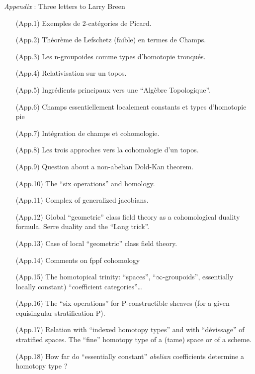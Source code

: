 \documentclass[11pt,a4paper]{article}
\begin{document}
\emph{Appendix} : Three letters to Larry Breen
\begin{itemize}
  \item[(App.1)] Exemples de 2-catégories de Picard.
  \item[(App.2)]  Théorème de Lefschetz (faible) en termes de \add{(}Champs.\add{)}
  \item[(App.3)] Les n-groupoides comme types d'homotopie tronqués.
  \item[(App.4)] Relativisation sur un topos.
  \item[(App.5)] Ingrédients principaux vers une ``Algèbre Topologique''.
  \item[(App.6)] Champs essentiellement localement constants et types d'homotopie \add{(}pie\ill{}
  \item[(App.7)] Intégration de champs et cohomologie.
  \item[(App.8)] Les trois approches vers la cohomologie d'un topos.
  \item[(App.9)]  Question about a non-abelian Dold-Kan theorem.
  \item[(App.10)] The ``six operations'' and homology.
  \item[(App.11)] Complex of generalized jacobians.
  \item[(App.12)] Global ``geometric'' class field theory as a cohomological duality formula. Serre duality and the ``Lang trick''.
  \item[(App.13)] Case of local ``geometric'' class field theory.
  \item[(App.14)] Comments on fppf cohomology  
  \item[(App.15)] The homotopical trinity: \add{(}``spaces'', ``$\infty$-groupoids'', \add{(}essentially locally constant) ``coefficient categories''…
  \item[(App.16)] The ``six operations'' for P-constructible sheaves (for a given equisingular stratification P).
  \item[(App.17)] Relation with ``indexed homotopy types'' and with ``dévissage'' of stratified spaces. The ``fine'' homotopy type of a (tame) space or of a scheme.
  \item[(App.18)] How far do ``essentially constant'' \emph{abelian} coefficients determine a homotopy type ?
\end{itemize}
\end{document}
